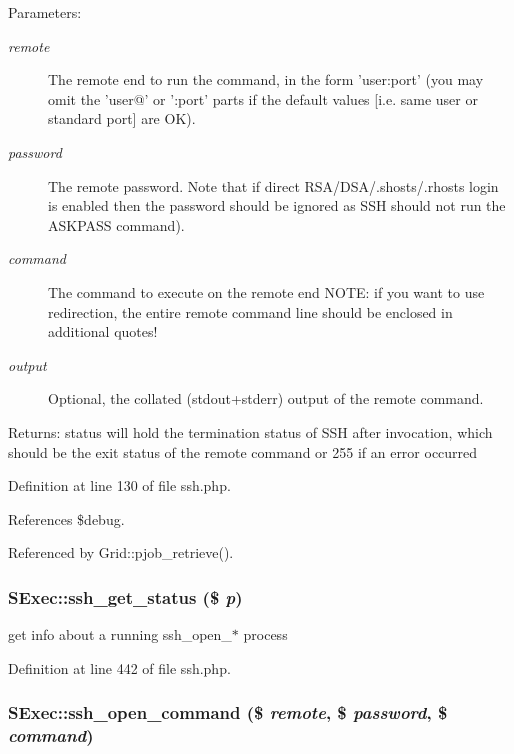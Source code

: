\begin{Desc}
\item[Parameters:]
\begin{description}
\item[{\em remote}]The remote end to run the command, in the form 'user:port' (you may omit the 'user@' or ':port' parts if the default values [i.e. same user or standard port] are OK). \item[{\em password}]The remote password. Note that if direct RSA/DSA/.shosts/.rhosts login is enabled then the password should be ignored as SSH should not run the ASKPASS command). \item[{\em command}]The command to execute on the remote end NOTE: if you want to use redirection, the entire remote command line should be enclosed in additional quotes! \item[{\em output}]Optional, the collated (stdout+stderr) output of the remote command. \end{description}
\end{Desc}
\begin{Desc}
\item[Returns:]status will hold the termination status of SSH after invocation, which should be the exit status of the remote command or 255 if an error occurred \end{Desc}


Definition at line 130 of file ssh.php.

References \$debug.

Referenced by Grid::pjob\_\-retrieve().
\subsubsection{\setlength{\rightskip}{0pt plus 5cm}SExec::ssh\_\-get\_\-status (\$ {\em p})}\label{classSExec_a8}


get info about a running ssh\_\-open\_\-$\ast$ process 



Definition at line 442 of file ssh.php.
\subsubsection{\setlength{\rightskip}{0pt plus 5cm}SExec::ssh\_\-open\_\-command (\$ {\em remote}, \$ {\em password}, \$ {\em command})}\label{classSExec_a6}


